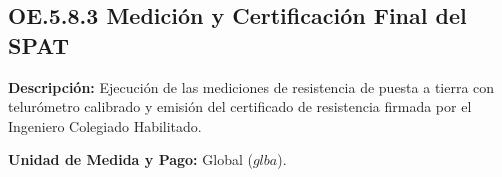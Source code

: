 \subsection{OE.5.8.3 Medición y Certificación Final del SPAT}
\textbf{Descripción:} Ejecución de las mediciones de resistencia de puesta a tierra con telurómetro calibrado y emisión del certificado de resistencia firmada por el Ingeniero Colegiado Habilitado.

\textbf{Unidad de Medida y Pago:} Global ($glba$).

